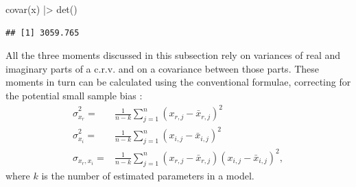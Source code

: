 \documentclass[
]{book}
\newenvironment{Shaded}{\begin{snugshade}}{\end{snugshade}}
\newcommand{\FunctionTok}[1]{\textcolor[rgb]{0.00,0.00,0.00}{#1}}
\newcommand{\NormalTok}[1]{#1}
\newcommand{\SpecialCharTok}[1]{\textcolor[rgb]{0.00,0.00,0.00}{#1}}
\begin{document}
\begin{Shaded}
\begin{Highlighting}[]
\FunctionTok{covar}\NormalTok{(x) }\SpecialCharTok{|\textgreater{}} \FunctionTok{det}\NormalTok{()}
\end{Highlighting}
\end{Shaded}

\begin{verbatim}
## [1] 3059.765
\end{verbatim}

All the three moments discussed in this subsection rely on variances of real and imaginary parts of a c.r.v. and on a covariance between those parts. These moments in turn can be calculated using the conventional formulae, correcting for the potential small sample bias \citep{referenceSBA}:
\begin{equation}
    \begin{aligned}
        \hat{\sigma}_{x_r}^2 = & \frac{1}{n-k} \sum_{j=1}^n (x_{r,j}-\bar{x}_{r,j})^2 \\
        \hat{\sigma}_{x_i}^2 = & \frac{1}{n-k} \sum_{j=1}^n (x_{i,j}-\bar{x}_{i,j})^2 \\
        \hat{\sigma}_{x_r, x_i} = & \frac{1}{n-k} \sum_{j=1}^n (x_{r,j}-\bar{x}_{r,j})(x_{i,j}-\bar{x}_{i,j})^2 ,
    \end{aligned}
    \label{eq:crvMomentSecondSample}
\end{equation}
where \(k\) is the number of estimated parameters in a model.
\end{document}

